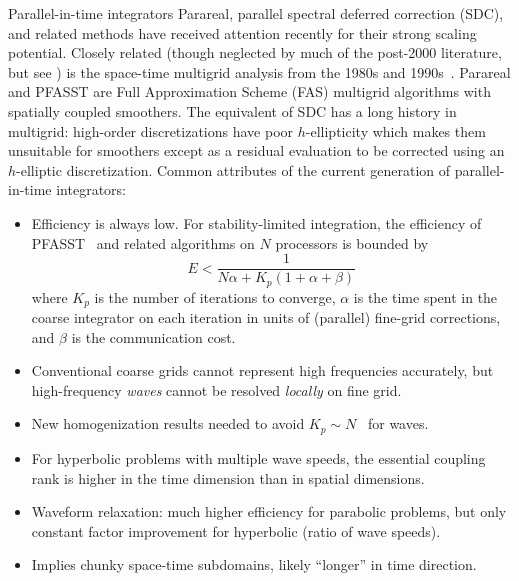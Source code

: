 \documentclass[final,t]{beamer}
\begin{document}
\begin{frame}{}
\begin{columns}
\begin{column}{0.31\textwidth}
      \begin{block}{Parallel-in-time integrators}
        Parareal, parallel spectral deferred correction (SDC), and related methods have received attention recently for their strong scaling potential.
        Closely related (though neglected by much of the post-2000 literature, but see \cite{gander2007analysis}) is the space-time multigrid analysis from the 1980s and 1990s~\cite{vandewalle1995fourier,horton1995polylog,brandt1991parabolic}.
        Parareal and PFASST are Full Approximation Scheme (FAS) multigrid algorithms with spatially coupled smoothers.
        The equivalent of SDC has a long history in multigrid: high-order discretizations have poor $h$-ellipticity which makes them unsuitable for smoothers except as a residual evaluation to be corrected using an $h$-elliptic discretization.
        Common attributes of the current generation of parallel-in-time integrators:
        \begin{itemize}
        \item Efficiency is always low.  For stability-limited integration, the efficiency of PFASST~\cite{emmett2012toward} and related algorithms on $N$ processors is bounded by
          \begin{equation*}
            E < \frac{1}{N \alpha + K_p (1 + \alpha + \beta)}
          \end{equation*}
          where $K_p$ is the number of iterations to converge, $\alpha$ is the time spent in the coarse integrator on each iteration in units of (parallel) fine-grid corrections, and $\beta$ is the communication cost.
        \item Conventional coarse grids cannot represent high frequencies accurately, but high-frequency \emph{waves} cannot be resolved \emph{locally} on fine grid.
        \item New homogenization results needed to avoid $K_p \sim N$~\cite{gander2008hyperbolic} for waves.
        \item For hyperbolic problems with multiple wave speeds, the essential coupling rank is higher in the time dimension than in spatial dimensions.
        \item Waveform relaxation: much higher efficiency for parabolic problems, but only constant factor improvement for hyperbolic (ratio of wave speeds).
        \item Implies chunky space-time subdomains, likely ``longer'' in time direction.
        \end{itemize}
      \end{block}

\end{column}
\end{columns}
\end{frame}
\end{document}
